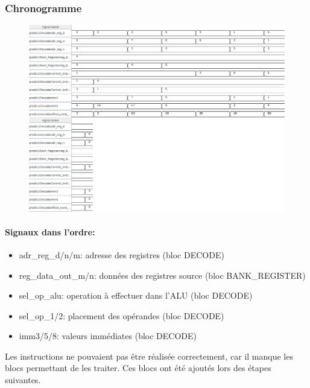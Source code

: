 \documentclass[a4paper]{article} %
\begin{document}
\subsubsection{Chronogramme}
\begin{figure}[H]
    \centering
    \includegraphics[width=1\textwidth]{src/CHRONO_ETAPE1.png}
    \label{fig:Chronogramme}
\end{figure}
\paragraph{Signaux dans l'ordre:}
\begin{itemize}
    \item     adr\_reg\_d/n/m: adresse des registres (bloc DECODE)
    \item     reg\_data\_out\_m/n: données des registres source (bloc BANK\_REGISTER)
    \item     sel\_op\_alu: operation à effectuer dans l'ALU (bloc DECODE)
    \item     sel\_op\_1/2: placement des opérandes (bloc DECODE)
    \item     imm3/5/8: valeurs immédiates (bloc DECODE)
\end{itemize}

Les instructions ne pouvaient pas être réalisée correctement, car il manque les blocs permettant de les traiter. Ces blocs ont été ajoutés lors des étapes suivantes.
\end{document}
